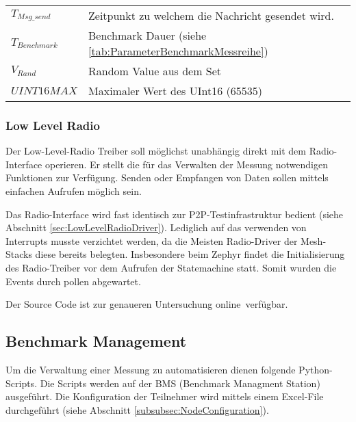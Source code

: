 \begin{small}
	\begin{center}
		\begin{tabular}{ll}
			$T_{Msg\_send}$ & Zeitpunkt zu welchem die Nachricht gesendet wird.\\
			$T_{Benchmark}$ & Benchmark Dauer (siehe \ref{tab:ParameterBenchmarkMessreihe})\\
			$V_{Rand}$ & Random Value aus dem Set \\
			$UINT16MAX$ & Maximaler Wert des UInt16 (65535) \\
		\end{tabular}
	\end{center}
\end{small}


\subsubsection{Low Level Radio}\label{subsubsec:LowLevelRadio}

Der Low-Level-Radio Treiber soll möglichst unabhängig direkt mit dem Radio-Interface operieren. Er stellt die für das Verwalten der Messung notwendigen Funktionen zur Verfügung. Senden oder Empfangen von Daten sollen mittels einfachen Aufrufen möglich sein.

Das Radio-Interface wird fast identisch zur P2P-Testinfrastruktur bedient (siehe Abschnitt \ref{sec:LowLevelRadioDriver}). Lediglich auf das verwenden von Interrupts musste verzichtet werden, da die Meisten Radio-Driver der Mesh-Stacks diese bereits belegten. Insbesondere beim Zephyr findet die Initialisierung des Radio-Treiber vor dem Aufrufen der Statemachine statt. Somit wurden die Events durch pollen abgewartet.

Der Source Code ist zur genaueren Untersuchung online\footnotemark\ verfügbar. 


\subsection{Benchmark Management}\label{subsec:Benchmark Management}

Um die Verwaltung einer Messung zu automatisieren dienen folgende Python-Scripts. Die Scripts werden auf der BMS (Benchmark Managment Station) ausgeführt. Die Konfiguration der Teilnehmer wird mittels einem Excel-File durchgeführt (siehe Abschnitt \ref{subsubsec:NodeConfiguration}). 


